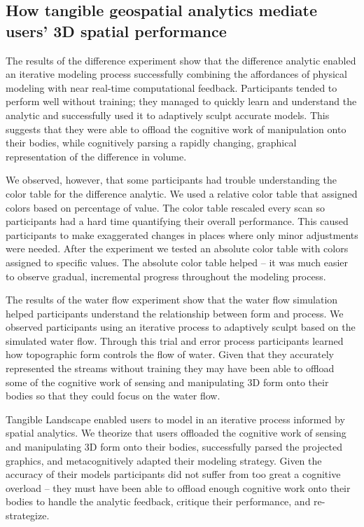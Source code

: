 \documentclass[prodmode,acmtochi]{acmsmall} %
\begin{document}
\subsection{How tangible geospatial analytics mediate users' 3D spatial performance} 
The results of the difference experiment show that 
the difference analytic 
enabled an iterative modeling process
successfully combining the affordances of physical modeling
with near real-time computational feedback. 
%
Participants tended to perform well without training; 
they managed to quickly learn and 
understand the analytic
and successfully used it to adaptively sculpt
accurate models.
%
This suggests that they were able to offload the cognitive work 
of manipulation onto their bodies, while cognitively 
parsing a rapidly changing, graphical representation 
of the difference in volume.

We observed, however, that some participants had trouble understanding
the color table for the difference analytic. 
We used a relative color table 
that assigned colors based on percentage of value.
The color table rescaled every scan 
so participants had a hard time quantifying their overall performance.
This caused participants to make exaggerated changes in places
where only minor adjustments were needed.
%
After the experiment we tested an absolute color table
with colors assigned to specific values.
The absolute color table helped -- it was much easier 
to observe gradual, incremental progress throughout the modeling process.

The results of the water flow experiment show 
that the water flow simulation helped participants 
understand the relationship between form and process.
We observed participants using an iterative process
to adaptively sculpt based on the simulated water flow. 
Through this trial and error process 
participants learned how
topographic form controls the flow of water.
%
Given that they accurately represented the streams without training
they may have been able to offload 
some of the cognitive work of sensing and manipulating 
3D form onto their bodies so that 
they could focus on the water flow. 

Tangible Landscape enabled users 
to model in an iterative process informed by spatial analytics.
We theorize that users offloaded the cognitive work 
of sensing and manipulating 3D form onto their bodies,
successfully parsed the projected graphics,
and metacognitively adapted their modeling strategy.
Given the accuracy of their models 
participants did not suffer from too great a cognitive overload 
-- they must have been able to offload enough cognitive work onto their bodies
to handle the analytic feedback, critique their performance, and re-strategize.
\end{document}
